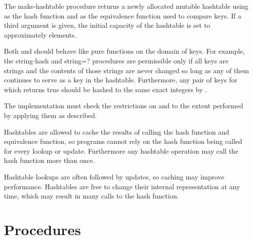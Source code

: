 \begin{entry}{%
}

The {\cf make-hashtable} procedure returns a newly allocated mutable
hashtable using  
as the hash function and  as the equivalence function used to 
compare keys.
If a third argument is given, the 
initial capacity of the hashtable is set to approximately  elements.

Both  and  should behave like pure functions
on the domain of keys.  For example, the {\cf string-hash}
and {\cf string=?} procedures are permissible only if all
keys are strings and the contents of those strings are never
changed so long as any of them continues to serve as a key in
the hashtable.  Furthermore, any pair of keys for which
 returns true should
be hashed to the same exact integers by 
.

\implresp The implementation must check the restrictions on
 and  to the extent performed by
applying them as described.

\begin{note}
Hashtables are allowed to cache the results of calling the
hash function and equivalence function, so programs cannot
rely on the hash function being called for every lookup or
update.  Furthermore any hashtable operation may call the
hash function more than once.
\end{note}

\begin{rationale}
Hashtable lookups are often followed by updates, so caching
may improve performance.  Hashtables are free to change
their internal representation at any time, which may result
in many calls to the hash function.
\end{rationale}

\end{entry}

\section{Procedures}

